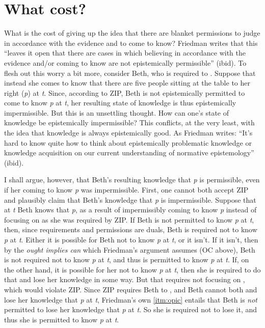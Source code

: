 \documentclass[12pt]{article}
\begin{document}
\section{What cost?}

What is the cost of giving up the idea that there are blanket permissions to judge in accordance with the evidence and to come to know? Friedman writes that this ``leaves it open that there are cases in which believing in accordance with the evidence and/or coming to know are not epistemically permissible'' (ibid). To flesh out this worry a bit more, consider Beth, who is required to \foc{}. Suppose that instead she comes to know that there are five people sitting at the table to her right (\textit{p}) at \textit{t}. Since, according to ZIP, Beth is not epistemically permitted to come to know \textit{p} at \textit{t}, her resulting state of knowledge is thus epistemically impermissible. But this is an unsettling thought. How can one's state of knowledge be epistemically impermissible? This conflicts, at the very least, with the idea that knowledge is always epistemically good. As Friedman writes: ``It’s hard to know quite how to think about epistemically problematic knowledge or knowledge acquisition on our current understanding of normative epistemology'' (ibid).

I shall argue, however, that Beth's resulting knowledge that \textit{p} is permissible, even if her coming to know \textit{p} was impermissible. First, one cannot both accept ZIP and plausibly claim that Beth's knowledge that \textit{p} is impermissible. Suppose that at \textit{t} Beth knows that \textit{p}, as a result of impermissibly coming to know \textit{p} instead of focusing on  as she was required by ZIP. If Beth is not permitted to know \textit{p} at \textit{t}, then, since requirements and permissions are duals, Beth is required not to know \textit{p} at \textit{t}. Either it is possible for Beth not to know \textit{p} at \textit{t}, or it isn't. If it isn't, then by the \textit{ought implies can} which Friedman's argument assumes (OC above), Beth is not required not to know \textit{p} at \textit{t}, and thus is permitted to know \textit{p} at \textit{t}. If, on the other hand, it is possible for her not to know \textit{p} at \textit{t}, then she is required to do that and lose her knowledge in some way. But that requires not focusing on , which would violate ZIP. Since ZIP requires Beth to \foc{}, and Beth cannot both \foc{} and lose her knowledge that \textit{p} at \textit{t}, Friedman's own \ref*{itm:opic} entails that Beth is \textit{not} permitted to lose her knowledge that \textit{p} at \textit{t}. So she is required not to lose it, and thus she is permitted to know \textit{p} at \textit{t}.
\end{document}
